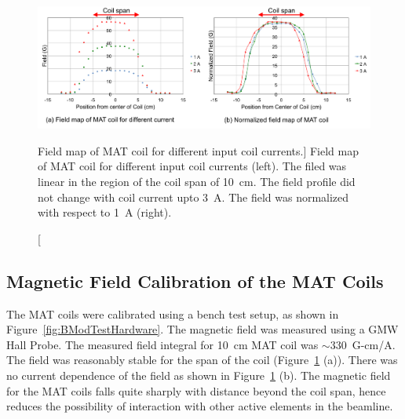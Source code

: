  \begin{singlespace}
\begin{figure}[!h]
	\begin{center}
	\includegraphics[width=15.0cm]{figures/BModMATFieldIntegral}
	\end{center}
	\caption
	[Field map of MAT coil for different input coil currents.]
	{Field map of MAT coil for different input coil currents (left). The filed was linear in the region of the coil span of 10~cm. The field profile did not change with coil current upto 3~A. The field was normalized with respect to 1~A (right).}
	\label{fig:BModMATFieldIntegral}
\end{figure}
\end{singlespace}

\subsection{Magnetic Field Calibration of the MAT Coils}
\label{Magnetic Field Calibration of the MAT Coils}
The MAT coils were calibrated using a bench test setup, as shown in Figure~\ref{fig:BModTestHardware}. The magnetic field was measured using a GMW Hall Probe. The measured field integral for 10~cm MAT coil was $\sim$330~G-cm/A. The field was reasonably stable for the span of the coil (Figure~\ref{fig:BModMATFieldIntegral} (a)). There was no current dependence of the field as shown in Figure~\ref{fig:BModMATFieldIntegral} (b). The magnetic field for the MAT coils falls quite sharply with distance beyond the coil span, hence reduces the possibility of interaction with other active elements in the beamline.

